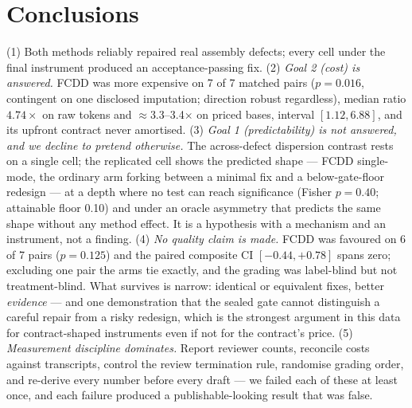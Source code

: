 \documentclass[runningheads]{llncs}
\begin{document}
\section{Conclusions}

(1) Both methods reliably repaired real assembly defects; every cell under
the final instrument produced an acceptance-passing fix.
(2) \emph{Goal 2 (cost) is answered.} FCDD was more expensive on 7 of 7
matched pairs ($p=0.016$, contingent on one disclosed imputation; direction
robust regardless), median ratio $4.74\times$ on raw tokens and
$\approx$3.3--3.4$\times$ on priced bases, interval $[1.12,6.88]$, and its
upfront contract never amortised.
(3) \emph{Goal 1 (predictability) is not answered, and we decline to pretend
otherwise.} The across-defect dispersion contrast rests on a single cell;
the replicated cell shows the predicted shape --- FCDD single-mode, the
ordinary arm forking between a minimal fix and a below-gate-floor redesign
--- at a depth where no test can reach significance (Fisher $p=0.40$;
attainable floor 0.10) and under an oracle asymmetry that predicts the same
shape without any method effect. It is a hypothesis with a mechanism and an
instrument, not a finding.
(4) \emph{No quality claim is made.} FCDD was favoured on 6 of 7 pairs
($p=0.125$) and the paired composite CI $[-0.44,+0.78]$ spans zero;
excluding one pair the arms tie exactly, and the grading was label-blind but
not treatment-blind. What survives is narrow: identical or equivalent fixes,
better \emph{evidence} --- and one demonstration that the sealed gate cannot
distinguish a careful repair from a risky redesign, which is the strongest
argument in this data for contract-shaped instruments even if not for the
contract's price.
(5) \emph{Measurement discipline dominates.} Report reviewer counts,
reconcile costs against transcripts, control the review termination rule,
randomise grading order, and re-derive every number before every draft ---
we failed each of these at least once, and each failure produced a
publishable-looking result that was false.
\end{document}
